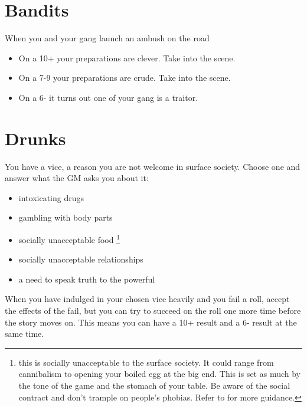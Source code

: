 \documentclass{tufte-book}
\begin{document}
\section{Bandits} 
When you and your gang launch an ambush on the road  
\begin{itemize}
\item On a 10+ your preparations are clever. Take  into the scene.
\item On a 7-9 your preparations are crude. Take  into the scene.
\item On a 6- it turns out one of your gang is a traitor.
\end{itemize}

\section{Drunks} 
You have a vice, a reason you are not welcome in surface society. Choose one and answer what the GM asks you about it:
\begin{itemize}
\item intoxicating drugs
\item gambling with body parts
\item socially unacceptable food \footnote{this is socially unacceptable to the surface society. It could range from cannibalism to opening your boiled egg at the big end. This is set as much by the tone of the game and the stomach of your table. Be aware of the social contract and don't trample on people's phobias. Refer to  for more guidance.}
\item socially unacceptable relationships
\item a need to speak truth to the powerful
\end{itemize}
When you have indulged in your chosen vice heavily and you fail a roll, accept the effects of the fail, but you can try to succeed on the roll one more time before the story moves on. This means you can have a 10+ result and a 6- result at the same time. 
\end{document}
